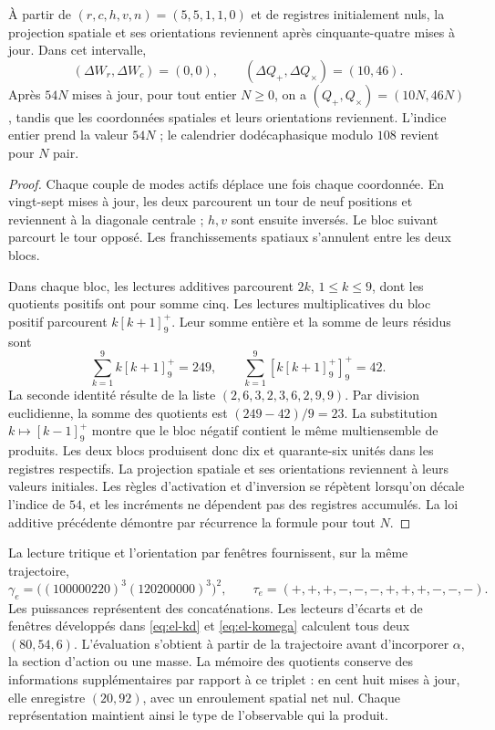 \begin{proposition}
\label{ii:electron-memoria-retorno}
À partir de \((r,c,h,v,n)=(5,5,1,1,0)\) et de registres initialement nuls, la
projection spatiale et ses orientations reviennent après cinquante-quatre
mises à jour. Dans cet intervalle,
\[
 (\Delta W_r,\Delta W_c)=(0,0),\qquad
 (\Delta Q_+,\Delta Q_\times)=(10,46).
\]
Après \(54N\) mises à jour, pour tout entier \(N\geq0\),
on a \((Q_+,Q_\times)=(10N,46N)\), tandis que les coordonnées
spatiales et leurs orientations reviennent. L'indice entier prend la valeur
\(54N\) ; le calendrier dodécaphasique modulo \(108\) revient pour
\(N\) pair.
\end{proposition}
\begin{proof}
Chaque couple de modes actifs déplace une fois chaque coordonnée. En
vingt-sept mises à jour, les deux parcourent un tour de neuf
positions et reviennent à la diagonale centrale ; \(h,v\) sont ensuite
inversés. Le bloc suivant parcourt le tour opposé. Les franchissements
spatiaux s'annulent entre les deux blocs.

Dans chaque bloc, les lectures additives parcourent \(2k\),
\(1\leq k\leq9\), dont les quotients positifs ont pour somme cinq. Les lectures
multiplicatives du bloc positif parcourent
\(k[k+1]^+_9\). Leur somme entière et la somme de leurs résidus sont
\[
 \sum_{k=1}^9 k[k+1]^+_9=249,\qquad
 \sum_{k=1}^9[k[k+1]^+_9]^+_9=42.
\]
La seconde identité résulte de la liste
\((2,6,3,2,3,6,2,9,9)\). Par division euclidienne,
la somme des quotients est \((249-42)/9=23\). La substitution
\(k\mapsto[k-1]^+_9\) montre que le bloc négatif contient
le même multiensemble de produits. Les deux blocs produisent donc
dix et quarante-six unités dans les registres respectifs.
La projection spatiale et ses orientations reviennent à leurs valeurs
initiales. Les règles d'activation et d'inversion se répètent lorsqu'on
décale l'indice de \(54\), et les incréments ne dépendent pas des
registres accumulés. La loi additive
précédente démontre par récurrence la formule pour tout \(N\).
\end{proof}

La lecture tritique et l'orientation par fenêtres fournissent, sur
la même trajectoire,
\[
 \gamma_e=\bigl((100000220)^3(120200000)^3\bigr)^2,\qquad
 \tau_e=(+,+,+,-,-,-,+,+,+,-,-,-).
\]
Les puissances représentent des concaténations. Les lecteurs d'écarts et de fenêtres développés dans \eqref{eq:el-kd} et \eqref{eq:el-komega} calculent tous deux \((80,54,6)\). L'évaluation s'obtient à partir de la trajectoire avant d'incorporer \(\alpha\), la section d'action ou une masse. La mémoire des quotients conserve des informations supplémentaires par rapport à ce triplet : en cent huit mises à jour, elle enregistre \((20,92)\), avec un enroulement spatial net nul. Chaque représentation maintient ainsi le type de l'observable qui la produit.
